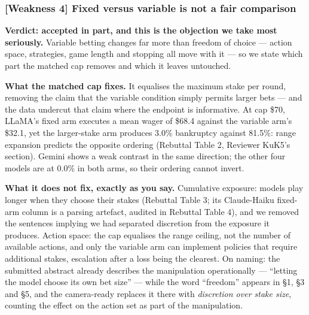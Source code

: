 
\subsubsection*{\textbf{[Weakness 4]} Fixed versus variable is not a fair comparison}

\textbf{Verdict: accepted in part, and this is the objection we take most seriously.} Variable
betting changes far more than freedom of choice --- action space, strategies, game length and
stopping all move with it --- so we state which part the matched cap removes and which it
leaves untouched.

\vspace{0.3em}
\noindent\textbf{What the matched cap fixes.} It equalises the maximum stake per round,
removing the claim that the variable condition simply permits larger bets --- and the data
undercut that claim where the endpoint is informative. At cap \$70, LLaMA's fixed arm
executes a mean wager of \$68.4 against the variable arm's \$32.1, yet the larger-stake arm
produces 3.0\% bankruptcy against 81.5\%: range expansion predicts the opposite ordering
(Rebuttal Table 2, Reviewer KuK5's section). Gemini shows a weak contrast in the same
direction; the other four models are at 0.0\% in both arms, so their ordering cannot invert.

\vspace{0.3em}
\noindent\textbf{What it does not fix, exactly as you say.} Cumulative exposure: models play
longer when they choose their stakes (Rebuttal Table 3; its Claude-Haiku fixed-arm column is a
parsing artefact, audited in Rebuttal Table 4), and we removed the sentences implying we had
separated discretion from the exposure it produces. Action space: the cap equalises the range
ceiling, not the number of available actions, and only the variable arm can implement policies
that require additional stakes, escalation after a loss being the clearest. On naming: the
submitted abstract already describes the manipulation operationally --- ``letting the model
choose its own bet size'' --- while the word ``freedom'' appears in \S1, \S3 and \S5, and the
camera-ready replaces it there with \emph{discretion over stake size}, counting the effect on
the action set as part of the manipulation.


